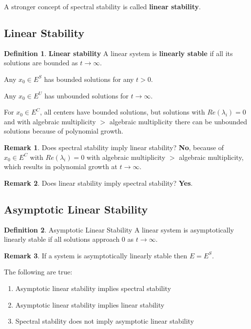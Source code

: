 \documentclass[12pt]{article}
\theoremstyle{definition}
\newtheorem*{definition}{Definition}
\newtheorem*{remark}{Remark}
\begin{document}
A stronger concept of spectral stability is called \textbf{linear stability}.

\subsection{Linear Stability}

\begin{definition} \textbf{Linear stability}
A linear system is \textbf{linearly stable} if all its solutions are bounded as $t \rightarrow \infty$.
\end{definition}

Any $x_0 \in E^S$ has bounded solutions for any $t > 0$.

Any $x_0 \in E^U$ has unbounded solutions for $t \rightarrow \infty$.

For $x_0 \in E^C$, all centers have bounded solutions, but solutions with $Re(\lambda_i) = 0$
and with algebraic multiplicity $>$ algebraic multiplicity there can be unbounded solutions
because of polynomial growth.

\begin{remark}
Does spectral stability imply linear stability? \textbf{No}, because of $x_0 \in E^C$ with
$Re(\lambda_i) = 0$ with algebraic multiplicity $>$ algebraic multiplicity, which results
in polynomial growth at $t \rightarrow \infty$.
\end{remark} 

\begin{remark}
Does linear stability imply spectral stability? \textbf{Yes}.
\end{remark}

\subsection{Asymptotic Linear Stability}

\begin{definition} Asymptotic Linear Stability
A linear system is asymptotically linearly stable if all solutions approach 0 as $t \rightarrow \infty$.
\end{definition}

\begin{remark}
If a system is asymptotically linearly stable then $E = E^S$.
\end{remark}

The following are true:
\begin{enumerate}
\item Asymptotic linear stability implies spectral stability
\item Asymptotic linear stability implies linear stability
\item Spectral stability does not imply asymptotic linear stability
\end{enumerate}
\end{document}
